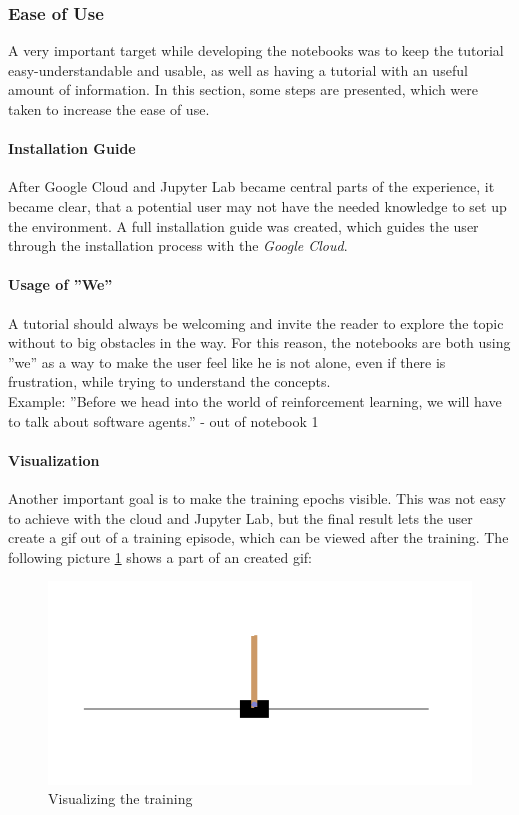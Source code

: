 \documentclass[10pt,a4paper]{article}
\begin{document}
		\subsubsection{Ease of Use}
		A very important target while developing the notebooks was to keep the tutorial easy-understandable and usable, as well as having a tutorial with an useful amount of information. In this section, some steps are presented, which were taken to increase the ease of use.
			\paragraph{Installation Guide}
			After Google Cloud and Jupyter Lab became central parts of the experience, it became clear, that a potential user may not have the needed knowledge to set up the environment. A full installation guide was created, which guides the user through the installation process with the \textit{Google Cloud}.
			\paragraph{Usage of ''We''}
			A tutorial should always be welcoming and invite the reader to explore the topic without to big obstacles in the way. For this reason, the notebooks are both using ''we'' as a way to make the user feel like he is not alone, even if there is frustration, while trying to understand the concepts.\\
			Example: ''Before we head into the world of reinforcement learning, we will have to talk about software agents.'' - out of notebook 1
			\paragraph{Visualization}
			Another important goal is to make the training epochs visible. This was not easy to achieve with the cloud and Jupyter Lab, but the final result lets the user create a gif out of a training episode, which can be viewed after the training. The following picture \ref{cartpole} shows a part of an created gif:
			
			\begin{figure}[h!]
				\begin{center}
					\includegraphics[width=0.6\linewidth]{img/cartpole01.png}
					\caption{Visualizing the training}
					\label{cartpole}
				\end{center}
			\end{figure}
		
\end{document}
